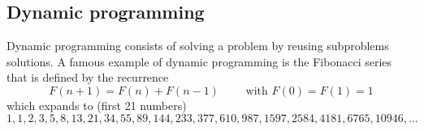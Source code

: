 



\newpage
\subsection{Dynamic programming} \label{intro_dp}
Dynamic programming consists of solving a problem by reusing subproblems solutions. A famous example of dynamic programming is the Fibonacci series that is defined by the recurrence
\[F(n+1) = F(n)+F(n-1) \qquad \text{ with } F(0)=F(1)=1 \]
which expands to (first 21 numbers)
\[1, 1, 2, 3, 5, 8, 13, 21, 34, 55, 89, 144, 233, 377, 610, 987, 1597, 2584, 4181, 6765, 10946, ...\]

